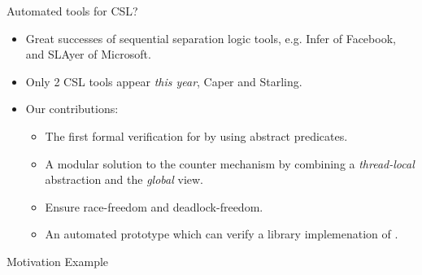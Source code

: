 \documentclass[11pt]{beamer}
\begin{document}
\begin{frame}{Automated tools for CSL?}
  \begin{itemize}
  \item Great successes of sequential separation logic tools, e.g. Infer of
    Facebook, and SLAyer of Microsoft. 
  \item Only 2 CSL tools appear \textit{this year}, Caper and Starling.
    \pause
  \item Our contributions:
    \begin{itemize}
    \item The first formal verification for {\CDL} by using abstract predicates.
    \item A modular solution to the counter mechanism by combining a
      \textit{thread-local} abstraction and the \textit{global} view.
    \item Ensure race-freedom and deadlock-freedom.
    \item An automated prototype which can verify a library implemenation of {\CDL}.
    \end{itemize}
  \end{itemize}
 \end{frame}

\begin{frame}{Motivation Example}

\end{frame}
\end{document}

